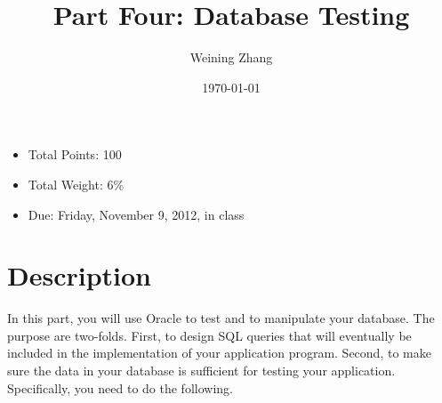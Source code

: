 \documentclass[11pt]{article}
\title{Part Four: Database Testing}
\author{Weining Zhang}
\date{\today}
\begin{document}
\maketitle


\begin{itemize}
\item Total Points: 100
\item Total Weight: 6\%
\item Due: Friday, November 9, 2012, in class
\end{itemize}

\section*{Description}
\label{sec-1}


  In this part, you will use Oracle to test and to manipulate your
  database. The purpose are two-folds. First, to design SQL queries
  that will eventually be included in the implementation of your
  application program. Second, to make sure the data in your database
  is sufficient for testing your application. Specifically, you need
  to do the following.
\end{document}
